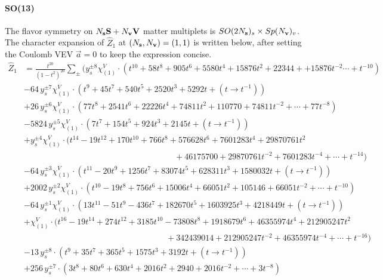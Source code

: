 \documentclass[letterpaper, 11pt]{article}
\newcommand{\nn}{\nonumber}
\begin{document}
{\paragraph{SO(13)} The flavor symmetry  on $N_{\bf s} \mathbf{S}+ N_{\bf v} \mathbf{V}$ matter multiplets is $SO(2N_{\bf s})_s \times  Sp(N_{\bf v})_v$. The character expansion of  $\hat{Z}_1$ at $(N_{\bf s}, N_{\bf v}) = (1,1)$ is written below, after setting the Coulomb VEV $\vec{a} = 0$ to keep the expression concise. 
\begin{align}
  \label{eq:so13-s1v1}
  \hat{Z}_1&=\frac{t^{20}}{(1-t^2)^{20}}\sum_{\pm}\Big(y_s^{\pm8}\chi^V_{(1)}\cdot (t^{10}+58 t^8+905 t^6+5580 t^4+15876 t^2+22344++15876 t^{-2} \cdots + t^{-10})\nn\\
  &-64\,y_s^{\pm7}\chi^V_{(1)} \cdot (t^9+45 t^7+540 t^5+2520 t^3+5292 t + (t\rightarrow t^{-1}))\nn\\
  &+26\,y_s^{\pm6}\chi^V_{(1)}\cdot (77 t^8+2541 t^6+22226 t^4+74811 t^2+110770 + 74811 t^{-2} + \cdots + 77 t^{-8})\nn\\
  &-5824\,y_s^{\pm5}\chi^V_{(1)} \cdot (7 t^7+154 t^5+924 t^3+2145 t + (t\rightarrow t^{-1}) )\nn\\
  &+y_s^{\pm4}\chi^V_{(1)} \cdot (t^{14}-19 t^{12}+170 t^{10}+766 t^8+576628 t^6 +7601283 t^4+29870761 t^2\nn\\
  &\qquad\qquad\qquad\qquad\qquad\qquad\qquad\qquad\qquad+46175700+ 29870761
  t^{-2} + 7601283 t^{-4}+\cdots +t^{-14})\nn\\
  &-64\,y_s^{\pm3}\chi^V_{(1)} \cdot (t^{11}-20 t^9+1256 t^7+83074 t^5+628311 t^3+1580032 t+ (t\rightarrow t^{-1}))\nn\\
  &+2002\,y_s^{\pm2}\chi^V_{(1)}\cdot (t^{10}-19 t^8+756 t^6+15006 t^4+66051 t^2+105146+66051 t^{-2} + \cdots + t^{-10})\nn\\
  &-64\,y_s^{\pm1}\chi^V_{(1)} \cdot (13 t^{11}-51 t^9-436 t^7+182670 t^5+1603925 t^3+4218449 t + (t\rightarrow t^{-1}))\nn\\
  &+\chi^V_{(1)} \cdot (t^{16}-19 t^{14}+274 t^{12}+3185 t^{10}-73808 t^8+1918679 t^6+46355974 t^4+212905247t^2\nn\\
  &\qquad\qquad\qquad\qquad\qquad\qquad\qquad\qquad\quad+342439014+212905247t^{-2}+46355974 t^{-4}+\cdots +t^{-16})\nn\\
  &-13\,y_s^{\pm8} \cdot (t^9+35 t^7+365 t^5+1575 t^3+3192 t+ (t\rightarrow t^{-1}))\nn\\
  &+256\,y_s^{\pm7}\cdot (3 t^8+80 t^6+630 t^4+2016
  t^2+2940+2016t^{-2}+\cdots+{3}t^{-8})\nn\\

\end{align}}
\end{document}
